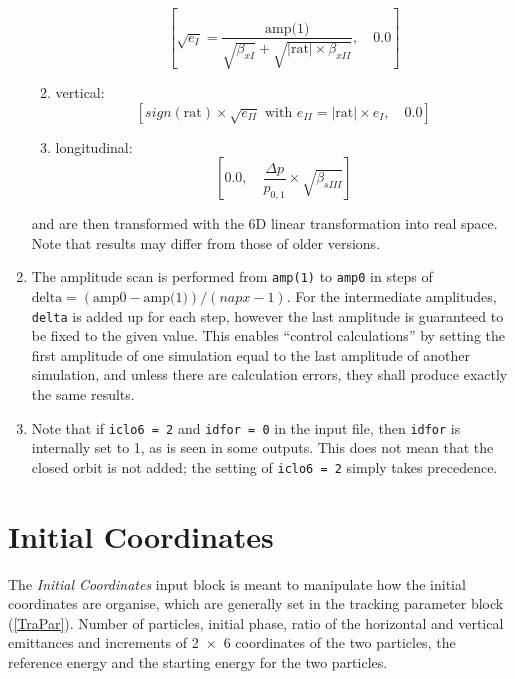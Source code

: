 \begin{enumerate}
\begin{enumerate}
            \begin{equation*}
                \left[\sqrt{e_I} = \frac{\mbox{amp(1)}} {\sqrt{\beta_{xI}}+\sqrt{\left|\mbox{rat}\right|\times\beta_{xII}}}, \quad 0.0 \right]
            \end{equation*}
            \item vertical:\\
            \begin{equation*}
                \left[sign(\mbox{rat})\times \sqrt{e_{II}} \mbox{ with } e_{II} = \left|\mbox{rat}\right|\times e_{I}, \quad 0.0 \right]
            \end{equation*}
            \item longitudinal:\\
            \begin{equation*}
                \left[0.0, \quad \frac{\Delta p}{p_{0,1}} \times \sqrt{\beta_{sIII}} \right]
            \end{equation*}
        \end{enumerate}
        and are then transformed with the 6D linear transformation into real space. Note that results may differ from those of older versions.
    \item The amplitude scan is performed from \texttt{amp(1)} to \texttt{amp0} in steps of $\mbox{delta} = (\mbox{amp0} - \mbox{amp(1)}) / (napx-1)$. For the intermediate amplitudes, \texttt{delta} is added up for each step, however the last amplitude is guaranteed to be fixed to the given value. This enables ``control calculations'' by setting the first amplitude of one simulation equal to the last amplitude of another simulation, and unless there are calculation errors, they shall produce exactly the same results.
    \item Note that if \texttt{iclo6 = 2} and \texttt{idfor = 0} in the input file, then \texttt{idfor} is internally set to 1, as is seen in some outputs. This does not mean that the closed orbit is not added; the setting of \texttt{iclo6 = 2} simply takes precedence.
\end{enumerate}

\section{Initial Coordinates} \label{IniCoo}

The \textit{Initial Coordinates} input block is meant to manipulate how the initial coordinates are organise, which are generally set in the tracking parameter block (\ref{TraPar}).
Number of particles, initial phase, ratio of the horizontal and vertical emittances and increments of \mbox{2 $\times$ 6} coordinates of the two particles, the reference energy and the starting energy for the two particles.

